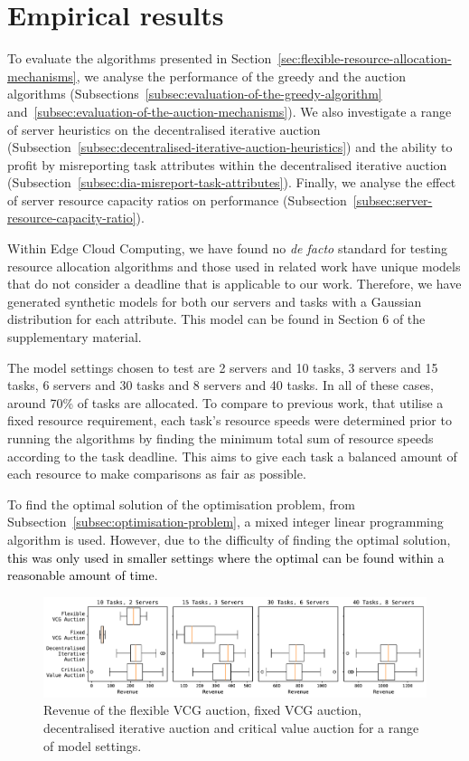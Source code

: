 \section{Empirical results}
\label{sec:empirical-results}
To evaluate the algorithms presented in Section~\ref{sec:flexible-resource-allocation-mechanisms}, we analyse the performance of  the greedy and the  auction algorithms (Subsections~\ref{subsec:evaluation-of-the-greedy-algorithm} and~\ref{subsec:evaluation-of-the-auction-mechanisms}). We also investigate a range of server heuristics on the decentralised iterative auction (Subsection~\ref{subsec:decentralised-iterative-auction-heuristics}) and the ability to profit by misreporting task attributes within the decentralised iterative auction (Subsection~\ref{subsec:dia-misreport-task-attributes}). Finally, we analyse the effect of server resource capacity ratios on performance (Subsection~\ref{subsec:server-resource-capacity-ratio}).

Within Edge Cloud Computing, we have found no \emph{de facto} standard for testing resource allocation algorithms and those used in related work have unique models that do not consider a deadline that is applicable to our work. Therefore, we have generated synthetic models for both our servers and tasks with a Gaussian distribution for each attribute. This model can be found in Section 6 of the supplementary material. 

The model settings chosen to test are 2 servers and 10 tasks, 3 servers and 15 tasks, 6 servers and 30 tasks and 8 servers and 40 tasks. In all of these cases, around 70\% of tasks are allocated. To compare to previous work, that utilise a fixed resource requirement, each task's resource speeds were determined prior to running the algorithms by finding the minimum total sum of resource speeds according to the task deadline. This aims to give each task a balanced amount of each resource to make comparisons as fair as possible.

To find the optimal solution of the optimisation problem, from Subsection~\ref{subsec:optimisation-problem}, a mixed integer linear programming algorithm is used. However, due to the difficulty of finding the optimal solution, \textcolor{black}{this was only used in smaller settings where the optimal can be found within a reasonable amount of time}. 

\begin{figure}[t]
    \centering
    \includegraphics[width=\textwidth]{figs/auctions/revenue.pdf}
    \caption{Revenue of the flexible VCG auction, fixed VCG auction, decentralised iterative auction and critical value auction for a range of model settings.}
    \label{fig:auction-mechanisms-revenue}
\end{figure}

